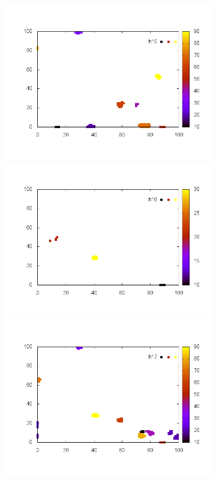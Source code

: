 \documentclass[10pt,a4paper]{article}
\begin{document}
\begin{figure}
\begin{subfigure}[b]{1\textwidth}
\includegraphics[scale=.3]{./img/SCC_Stable3/cut95p/15.png}
\includegraphics[scale=.3]{./img/SCC_Stable3/cut95p/16.png}
\includegraphics[scale=.3]{./img/SCC_Stable3/cut95p/17.png}
\end{subfigure}


\end{figure}
\end{document}
